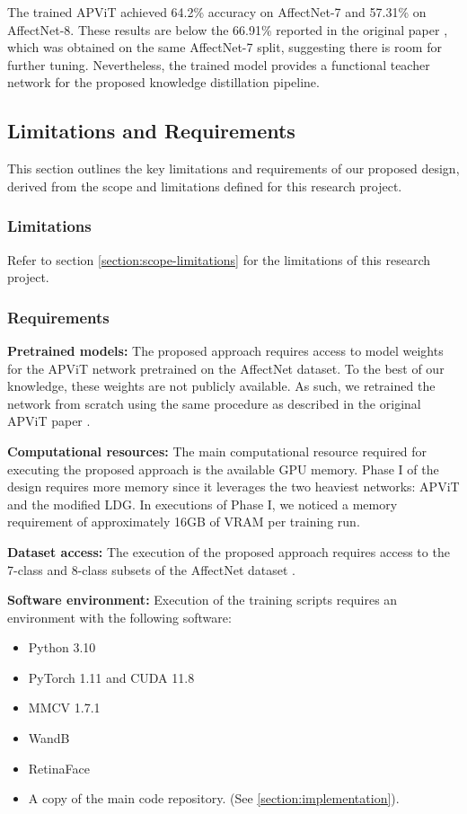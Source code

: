 The trained APViT achieved 64.2\% accuracy on AffectNet-7 and 57.31\% on AffectNet-8. These results are below the 66.91\% reported in the original paper \cite{apvit2023}, which was obtained on the same AffectNet-7 split, suggesting there is room for further tuning. Nevertheless, the trained model provides a functional teacher network for the proposed knowledge distillation pipeline.

\subsection{Limitations and Requirements}

This section outlines the key limitations and requirements of our proposed design, derived from the scope and limitations defined for this research project.

\subsubsection{Limitations}

Refer to section \ref{section:scope-limitations} for the limitations of this research project.

\subsubsection{Requirements}

\textbf{Pretrained models:} \label{section:design-pretrained-models} The proposed approach requires access to model weights for the APViT network pretrained on the AffectNet dataset. To the best of our knowledge, these weights are not publicly available. As such, we retrained the network from scratch using the same procedure as described in the original APViT paper \cite{apvit2023}.

\textbf{Computational resources:} The main computational resource required for executing the proposed approach is the available GPU memory. Phase I of the design requires more memory since it leverages the two heaviest networks: APViT and the modified LDG. In executions of Phase I, we noticed a memory requirement of approximately 16GB of VRAM per training run.

\textbf{Dataset access:} The execution of the proposed approach requires access to the 7-class and 8-class subsets of the AffectNet dataset \cite{affnet2019}.

\textbf{Software environment:} Execution of the training scripts requires an environment with the following software:
\begin{itemize}
    \item Python 3.10
    \item PyTorch 1.11 and CUDA 11.8
    \item MMCV 1.7.1
    \item WandB
    \item RetinaFace \cite{retinaface2020}
    \item A copy of the main code repository. (See \ref{section:implementation}).
\end{itemize}

